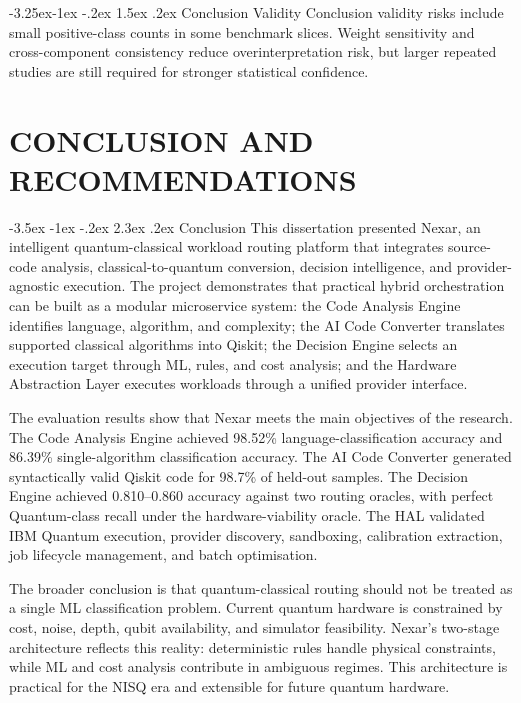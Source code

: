 \documentclass[12pt,a4paper]{report}
\makeatletter
\renewcommand\section{\@startsection{section}{1}{\z@}%
  {-3.5ex \@plus -1ex \@minus -.2ex}%
  {2.3ex \@plus.2ex}%
  {\normalfont\bfseries\fontsize{12pt}{16pt}\selectfont}}
\renewcommand\subsection{\@startsection{subsection}{2}{\z@}%
  {-3.25ex\@plus -1ex \@minus -.2ex}%
  {1.5ex \@plus .2ex}%
  {\normalfont\bfseries\fontsize{12pt}{16pt}\selectfont}}
\makeatother
\begin{document}
\subsection{Conclusion Validity}
Conclusion validity risks include small positive-class counts in some benchmark slices. Weight sensitivity and cross-component consistency reduce overinterpretation risk, but larger repeated studies are still required for stronger statistical confidence.

\chapter{CONCLUSION AND RECOMMENDATIONS}

\section{Conclusion}
This dissertation presented Nexar, an intelligent quantum-classical workload routing platform that integrates source-code analysis, classical-to-quantum conversion, decision intelligence, and provider-agnostic execution. The project demonstrates that practical hybrid orchestration can be built as a modular microservice system: the Code Analysis Engine identifies language, algorithm, and complexity; the AI Code Converter translates supported classical algorithms into Qiskit; the Decision Engine selects an execution target through ML, rules, and cost analysis; and the Hardware Abstraction Layer executes workloads through a unified provider interface.

The evaluation results show that Nexar meets the main objectives of the research. The Code Analysis Engine achieved 98.52\% language-classification accuracy and 86.39\% single-algorithm classification accuracy. The AI Code Converter generated syntactically valid Qiskit code for 98.7\% of held-out samples. The Decision Engine achieved 0.810--0.860 accuracy against two routing oracles, with perfect Quantum-class recall under the hardware-viability oracle. The HAL validated IBM Quantum execution, provider discovery, sandboxing, calibration extraction, job lifecycle management, and batch optimisation.

The broader conclusion is that quantum-classical routing should not be treated as a single ML classification problem. Current quantum hardware is constrained by cost, noise, depth, qubit availability, and simulator feasibility. Nexar's two-stage architecture reflects this reality: deterministic rules handle physical constraints, while ML and cost analysis contribute in ambiguous regimes. This architecture is practical for the NISQ era and extensible for future quantum hardware.
\end{document}
